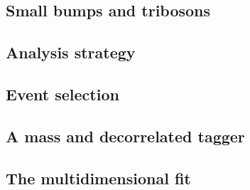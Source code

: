 \subsection{Small bumps and tribosons}
\subsection{Analysis strategy}
\subsection{Event selection}
\subsection{A mass and \PT decorrelated tagger}
\subsection{The multidimensional fit}